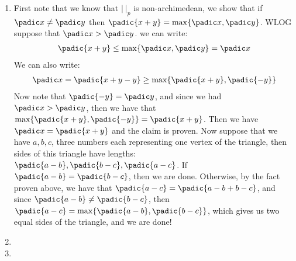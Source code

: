 \begin{enumerate}[label=\ilabel]
    \item 
        First note that we know that $|\ |_p$ is non-archimedean, we show that if $\padic x \ne \padic y$ then $\padic{x + y} = \max \{ \padic x , \padic y \}$.
        WLOG suppose that $\padic x > \padic y$. we can write:
        \begin{gather*}
            \padic{x + y} \le \max \{\padic x, \padic y \} = \padic x 
        \end{gather*}
        We can also write:
        \begin{gather*}
            \padic x = \padic{x + y - y} \ge \max \{ \padic{x + y}, \padic{-y} \}
        \end{gather*}
        Now note that $\padic{-y} = \padic y$, and since we had $\padic x > \padic y$, then we have that $\max \{ \padic{x + y} , \padic{-y} \} = \padic{x + y}$. Then we have $\padic x = \padic{x + y}$ and the claim is proven.
        Now suppose that we have $a, b, c$, three numbers each representing one vertex of the triangle, then sides of this triangle have lengths: $\padic{a - b}, \padic{b - c}, \padic{a - c}$. If $\padic{a - b} = \padic{b - c}$, then we are done. Otherwise, by the fact proven above, we have that $\padic{a - c} = \padic{a - b + b - c}$, and since $\padic{a - b} \ne \padic{b - c}$, then $\padic{a - c} = \max \{\padic{a - b}, \padic{b - c} \}$, which gives us two equal sides of the triangle, and we are done!
    \item
        
    
    \item

    
\end{enumerate}